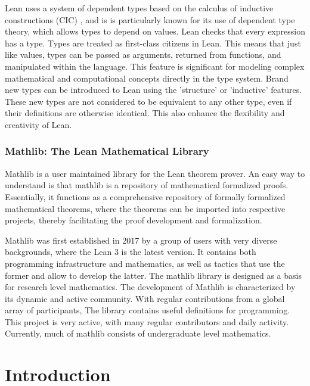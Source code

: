 Lean uses a system of dependent types based on
the calculus of inductive constructions (CIC)%
, and is is particularly known for its use of dependent type theory, which allows types to depend on values. Lean checks that every expression has a type. Types are treated as first-class citizens in Lean. %
This means that just like values, types can be passed as arguments, returned from functions, and manipulated within the language. This feature is significant for modeling complex mathematical and computational concepts directly in the type system. Brand new types can be introduced to Lean using the 'structure' or 'inductive' features. These new types are not considered to be equivalent to any other type, even if their definitions are otherwise identical. This also enhance the flexibility and creativity of Lean.




\subsubsection{Mathlib: The Lean Mathematical Library}
Mathlib is a user maintained library for the Lean theorem prover. An easy way to understand is that mathlib is a repository of mathematical formalized proofs.  Essentially, it functions as a comprehensive repository of formally formalized mathematical theorems, where the theorems can be imported into respective projects, thereby facilitating the proof development and formalization.

Mathlib was first established in 2017 by a group of users with very diverse backgrounds, where the Lean 3 is the latest version. It contains both programming infrastructure and mathematics, as well as tactics that use the former and allow to develop the latter. The mathlib library is designed as a basis for research level mathematics. The development of Mathlib is characterized by its dynamic and active community. With regular contributions from a global array of participants, The library contains useful definitions for programming. This project is very active, with many regular contributors and daily activity. Currently, much of mathlib consists of undergraduate level mathematics. %

\section{Introduction}

